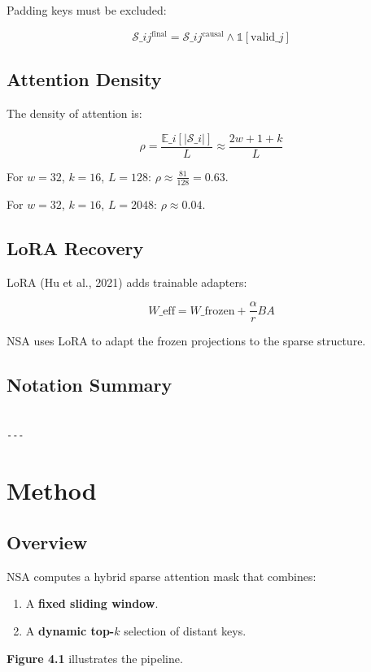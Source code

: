 Padding keys must be excluded:

\[
\mathcal{S}\_{ij}^\text{final} = \mathcal{S}\_{ij}^\text{causal} \land \mathbb{1}[\text{valid}\_j]
\tag{3.7}
\]

\subsection{Attention Density}

The density of attention is:

\[
\rho = \frac{\mathbb{E}\_i[|\mathcal{S}\_i|]}{L} \approx \frac{2w + 1 + k}{L}
\tag{3.8}
\]

For $w = 32$, $k = 16$, $L = 128$: $\rho \approx \frac{81}{128} = 0.63$.

For $w = 32$, $k = 16$, $L = 2048$: $\rho \approx 0.04$.

\subsection{LoRA Recovery}

LoRA (Hu et al., 2021) adds trainable adapters:

\[
W\_\text{eff} = W\_\text{frozen} + \frac{\alpha}{r} B A
\tag{3.9}
\]

NSA uses LoRA to adapt the frozen projections to the sparse structure.

\subsection{Notation Summary}

\begin{lstlisting}

---
\end{lstlisting}


\section{Method}

\subsection{Overview}

NSA computes a hybrid sparse attention mask that combines:
\begin{enumerate}
\item A \textbf{fixed sliding window}.
\item A \textbf{dynamic top-$k$} selection of distant keys.

\end{enumerate}
\textbf{Figure 4.1} illustrates the pipeline.

